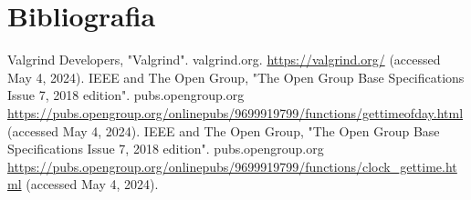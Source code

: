 \documentclass[11pt]{article}
\begin{document}
\section{Bibliografia}
\def\refname{}
\vspace{-1.5cm}
\begin{thebibliography}{9}
         Valgrind Developers, "Valgrind". valgrind.org.
         \url{https://valgrind.org/}
         (accessed May 4, 2024).
        IEEE and The Open Group, "The Open Group Base Specifications Issue 7, 2018 edition".
        pubs.opengroup.org
        \url{https://pubs.opengroup.org/onlinepubs/9699919799/functions/gettimeofday.html}
        (accessed May 4, 2024).
        IEEE and The Open Group, "The Open Group Base Specifications Issue 7, 2018 edition".
        pubs.opengroup.org
        \url{https://pubs.opengroup.org/onlinepubs/9699919799/functions/clock_gettime.html}
        (accessed May 4, 2024).
\end{thebibliography}
\end{document}
